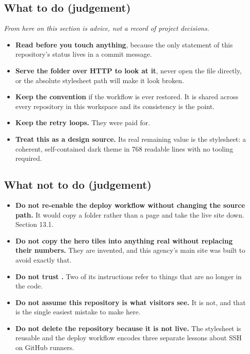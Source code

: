 \documentclass[11pt,a4paper]{article}
\begin{document}
\subsection{What to do (judgement)}

\emph{From here on this section is advice, not a record of project decisions.}

\begin{itemize}
\item \textbf{Read  before you touch anything}, because the only
  statement of this repository's status lives in a commit message.
\item \textbf{Serve the folder over HTTP to look at it}, never open the file
  directly, or the absolute stylesheet path will make it look broken.
\item \textbf{Keep the \code{[deploy]} convention} if the workflow is ever
  restored. It is shared across every repository in this workspace and its
  consistency is the point.
\item \textbf{Keep the retry loops.} They were paid for.
\item \textbf{Treat this as a design source.} Its real remaining value is the
  stylesheet: a coherent, self-contained dark theme in 768 readable lines with no
  tooling required.
\end{itemize}

\subsection{What not to do (judgement)}

\begin{itemize}
\item \textbf{Do not re-enable the deploy workflow without changing the
   source path.} It would copy a folder rather than a page and take
  the live site down. Section 13.1.
\item \textbf{Do not copy the hero tiles into anything real without replacing
  their numbers.} They are invented, and this agency's main site was built to
  avoid exactly that.
\item \textbf{Do not trust .} Two of its instructions refer to
  things that are no longer in the code.
\item \textbf{Do not assume this repository is what visitors see.} It is not, and
  that is the single easiest mistake to make here.
\item \textbf{Do not delete the repository because it is not live.} The
  stylesheet is reusable and the deploy workflow encodes three separate lessons
  about SSH on GitHub runners.
\end{itemize}
\end{document}
